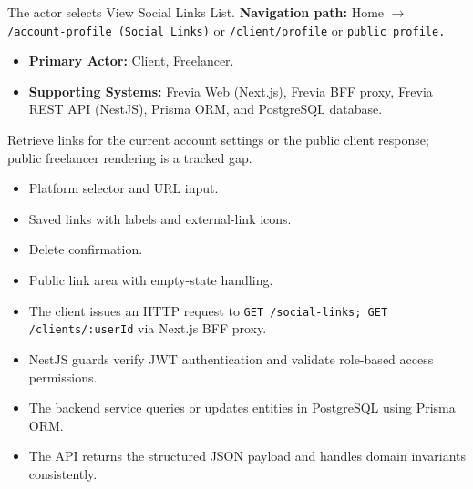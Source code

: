 The actor selects View Social Links List.\newline
\textbf{Navigation path:} Home $\rightarrow$ \texttt{/\allowbreak{}account-\allowbreak{}profile (Social Links)} or \texttt{/\allowbreak{}client/\allowbreak{}profile} or \texttt{public profile.}


\begin{itemize}[leftmargin=1.6em,topsep=3pt,itemsep=2pt,parsep=0pt,label=$\bullet$]
    \item \textbf{Primary Actor:} Client, Freelancer.
    \item \textbf{Supporting Systems:} Frevia Web (Next.js), Frevia BFF proxy, Frevia REST API (NestJS), Prisma ORM, and PostgreSQL database.
\end{itemize}

\noindent Retrieve links for the current account settings or the public client response; public freelancer rendering is a tracked gap.

\begin{itemize}[leftmargin=1.6em,topsep=3pt,itemsep=2pt,parsep=0pt,label=$\bullet$]
    \item Platform selector and URL input.
    \item Saved links with labels and external-link icons.
    \item Delete confirmation.
    \item Public link area with empty-state handling.
\end{itemize}

\begin{itemize}[leftmargin=1.6em,topsep=3pt,itemsep=2pt,parsep=0pt,label=$\bullet$]
    \item The client issues an HTTP request to \texttt{GET /\allowbreak{}social-\allowbreak{}links; GET /\allowbreak{}clients/\allowbreak{}:\allowbreak{}userId} via Next.js BFF proxy.
    \item NestJS guards verify JWT authentication and validate role-based access permissions.
    \item The backend service queries or updates entities in PostgreSQL using Prisma ORM.
    \item The API returns the structured JSON payload and handles domain invariants consistently.
\end{itemize}

